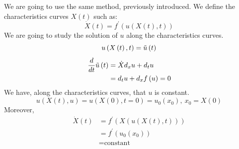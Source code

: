         We are going to use the same method, previously introduced.
        We define the characteristics curves $X\left(t\right)$ such as:
        \begin{equation*}
            {\dot X}\left(t\right) = f^\prime\left(u \left(X\left(t\right), t\right)\right)
        \end{equation*}
        We are going to study the solution of $u$ along the characteristics curves.
        \begin{equation}
            u\left(X\left(t\right),t\right) = \Tilde{u}\left(t\right)
        \end{equation}
        \begin{align*}
            \frac{d}{d t}\Tilde{u}\left(t\right) &= \dot X d_x u + d_t u \\
                                      &= d_t u + d_x f\left(u\right) = 0
        \end{align*}
        We have, along the characteristics curves, that $u$ is constant.
        \begin{equation}
            u\left(X\left(t\right), u\right) = u\left(X\left(0\right), t=0\right) = u_0\left(x_0\right), ~x_0 = X\left(0\right)
        \end{equation}
        Moreover,
        \begin{align*}
            \dot X\left(t\right) &= f^\prime\left(X\left(u\left(X\left(t\right),t\right)\right)\right) \\
                      &= f^\prime\left(u_0\left(x_0\right)\right) \\
                      &= \text{constant}
        \end{align*}
    
